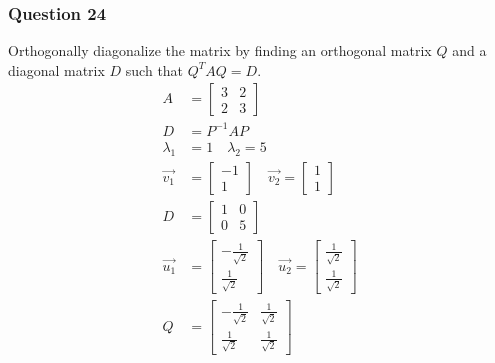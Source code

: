 \documentclass{math}
\begin{document}
\subsubsection*{Question 24}
Orthogonally diagonalize the matrix by finding an orthogonal matrix \( Q \) and
a diagonal matrix \( D \) such that \( Q^TAQ = D \).
\begin{align*}
  A &= \begin{bmatrix}3 & 2 \\ 2 & 3\end{bmatrix} \\
  D &= P^{-1}AP \\
  \lambda_1 &= 1 \quad \lambda_2 = 5 \\
  \vec{v_1} &= \begin{bmatrix}-1 \\ 1\end{bmatrix} \quad
    \vec{v_2} = \begin{bmatrix}1 \\ 1\end{bmatrix} \\
  D &= \begin{bmatrix}1 & 0 \\ 0 & 5\end{bmatrix} \\
  \vec{u_1} &= \begin{bmatrix}
    -\frac{1}{\sqrt{2}} \\
    \frac{1}{\sqrt{2}}
  \end{bmatrix} \quad \vec{u_2} = \begin{bmatrix}
    \frac{1}{\sqrt{2}} \\
    \frac{1}{\sqrt{2}}
  \end{bmatrix} \\
  Q &= \begin{bmatrix}
    -\frac{1}{\sqrt{2}} & \frac{1}{\sqrt{2}} \\
    \frac{1}{\sqrt{2}} & \frac{1}{\sqrt{2}}
  \end{bmatrix} \\
\end{align*}
\end{document}
